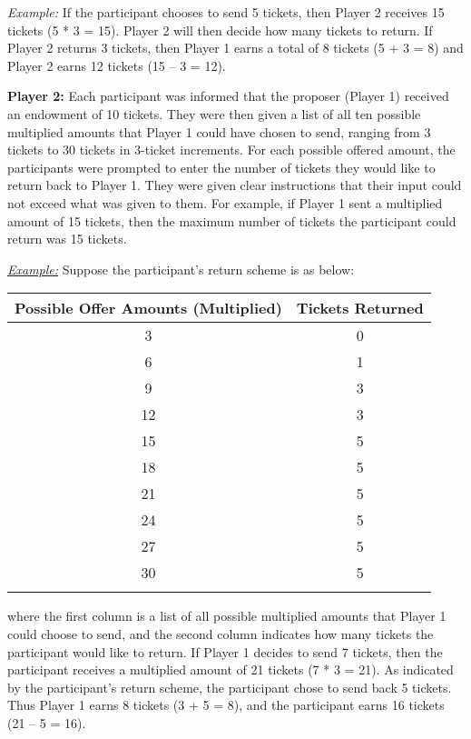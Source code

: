 \documentclass[12pt]{article}
\begin{document}
\textit{Example:} If the participant chooses to send 5 tickets, then Player 2 receives 15 tickets (5 * 3 = 15). Player 2 will then decide how many tickets to return. If Player 2 returns 3 tickets, then Player 1 earns a total of 8 tickets (5 + 3 = 8) and Player 2 earns 12 tickets (15 -- 3 = 12).

\textbf{Player 2:} Each participant was informed that the proposer (Player 1) received an endowment of 10 tickets. They were then given a list of all ten possible multiplied amounts that Player 1 could have chosen to send, ranging from 3 tickets to 30 tickets in 3-ticket increments. For each possible offered amount, the participants were prompted to enter the number of tickets they would like to return back to Player 1. They were given clear instructions that their input could not exceed what was given to them. For example, if Player 1 sent a multiplied amount of 15 tickets, then the maximum number of tickets the participant could return was 15 tickets.

\underline{\textit{Example:}} Suppose the participant\rq s return scheme is as below: \\

\begin{center}
\begin{tabular}{ c c }
\hline \hline
 Possible Offer Amounts (Multiplied) & Tickets Returned \\ 
 \hline
3 & 0  \\  
6 & 1 \\  
9 & 3  \\  
12 & 3  \\  
15 & 5   \\  
18 & 5  \\  
21 & 5 \\  
24 & 5 \\  
27 & 5 \\  
30 & 5 \\  
\hline \hline \\
\end{tabular}
\end{center} 


\noindent where the first column is a list of all possible multiplied amounts that Player 1 could choose to send, and the second column indicates how many tickets the participant would like to return. If Player 1 decides to send 7 tickets, then the participant receives a multiplied amount of 21 tickets (7 * 3 = 21). As indicated by the participant\rq s return scheme, the participant chose to send back 5 tickets. Thus Player 1 earns 8 tickets (3 + 5 =  8), and the participant earns 16 tickets (21 -- 5 = 16).
\end{document}
